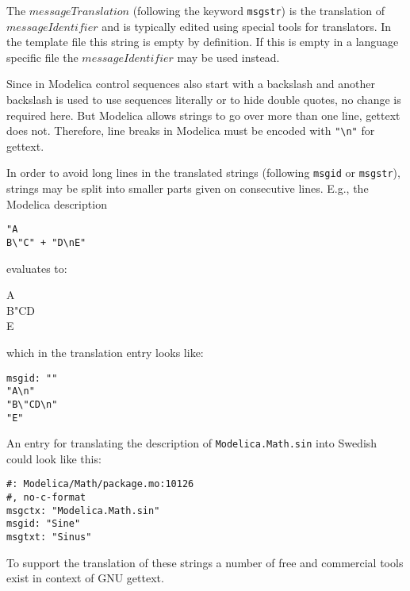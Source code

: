 \begin{nonnormative}
The $\mathit{messageTranslation}$ (following the keyword \lstinline!msgstr!) is the translation of $\mathit{messageIdentifier}$ and is typically edited using special tools for translators.
In the template file this string is empty by definition.
If this is empty in a language specific file the $\mathit{messageIdentifier}$ may be used instead.
\end{nonnormative}

\begin{nonnormative}
Since in Modelica control sequences also start with a backslash and another backslash is used to use sequences literally or to hide double quotes, no change is required here.
But Modelica allows strings to go over more than one line, gettext does not.
Therefore, line breaks in Modelica must be encoded with \lstinline!"\n"! for gettext.

In order to avoid long lines in the translated strings (following \lstinline!msgid! or \lstinline!msgstr!), strings may be split into smaller parts given on consecutive lines.
E.g., the Modelica description
\begin{lstlisting}
"A
B\"C" + "D\nE"
\end{lstlisting}
evaluates to:\par
\hspace{1em}\begin{minipage}{0.5\textwidth}
A\\
B"CD\\
E
\end{minipage}\par
which in the translation entry looks like:
\begin{lstlisting}
msgid: ""
"A\n"
"B\"CD\n"
"E"
\end{lstlisting}
\end{nonnormative}

\begin{example}
An entry for translating the description of \lstinline!Modelica.Math.sin! into Swedish could look like this:
\begin{lstlisting}
#: Modelica/Math/package.mo:10126
#, no-c-format
msgctx: "Modelica.Math.sin"
msgid: "Sine"
msgtxt: "Sinus"
\end{lstlisting}
\end{example}

\begin{nonnormative}
To support the translation of these strings a number of free and commercial tools exist in context of GNU gettext.
\end{nonnormative}

